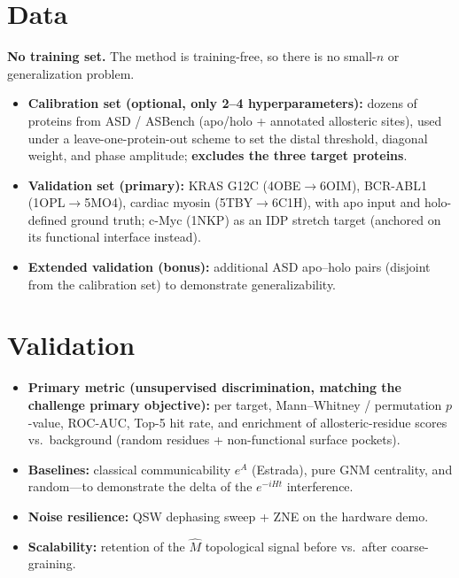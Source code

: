 \documentclass[11pt,a4paper]{article}
\newcommand{\mhat}{\hat{M}}
\newcommand{\lead}[1]{\textbf{#1}}
\begin{document}
\section{Data}
\lead{No training set.} The method is training-free, so there is no small-$n$ or generalization problem.
\begin{itemize}
\item \lead{Calibration set (optional, only 2--4 hyperparameters):} dozens of proteins from ASD / ASBench (apo/holo + annotated allosteric sites), used under a leave-one-protein-out scheme to set the distal threshold, diagonal weight, and phase amplitude; \lead{excludes the three target proteins}.
\item \lead{Validation set (primary):} KRAS G12C (4OBE$\rightarrow$6OIM), BCR-ABL1 (1OPL$\rightarrow$5MO4), cardiac myosin (5TBY$\rightarrow$6C1H), with apo input and holo-defined ground truth; c-Myc (1NKP) as an IDP stretch target (anchored on its functional interface instead).
\item \lead{Extended validation (bonus):} additional ASD apo--holo pairs (disjoint from the calibration set) to demonstrate generalizability.
\end{itemize}

\section{Validation}
\begin{itemize}
\item \lead{Primary metric (unsupervised discrimination, matching the challenge primary objective):} per target, Mann--Whitney / permutation $p$-value, ROC-AUC, Top-5 hit rate, and enrichment of allosteric-residue scores vs.\ background (random residues + non-functional surface pockets).
\item \lead{Baselines:} classical communicability $e^{A}$ (Estrada), pure GNM centrality, and random---to demonstrate the delta of the $e^{-iHt}$ interference.
\item \lead{Noise resilience:} QSW dephasing sweep + ZNE on the hardware demo.
\item \lead{Scalability:} retention of the $\mhat$ topological signal before vs.\ after coarse-graining.
\end{itemize}

\end{document}

